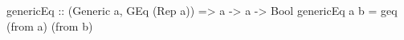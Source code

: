 \begin{code}
genericEq :: (Generic a, GEq (Rep a)) => a -> a -> Bool
genericEq a b = geq (from a) (from b)
\end{code}
